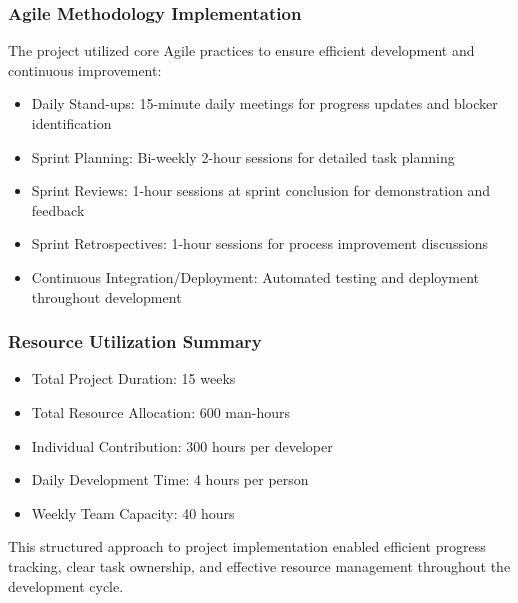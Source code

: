 \subsubsection{Agile Methodology Implementation}
The project utilized core Agile practices to ensure efficient development and continuous improvement:
\begin{itemize}
    \item Daily Stand-ups: 15-minute daily meetings for progress updates and blocker identification
    \item Sprint Planning: Bi-weekly 2-hour sessions for detailed task planning
    \item Sprint Reviews: 1-hour sessions at sprint conclusion for demonstration and feedback
    \item Sprint Retrospectives: 1-hour sessions for process improvement discussions
    \item Continuous Integration/Deployment: Automated testing and deployment throughout development
\end{itemize}

\subsubsection{Resource Utilization Summary}
\begin{itemize}
    \item Total Project Duration: 15 weeks
    \item Total Resource Allocation: 600 man-hours
    \item Individual Contribution: 300 hours per developer
    \item Daily Development Time: 4 hours per person
    \item Weekly Team Capacity: 40 hours
\end{itemize}

This structured approach to project implementation enabled efficient progress tracking, clear task ownership, and effective resource management throughout the development cycle.